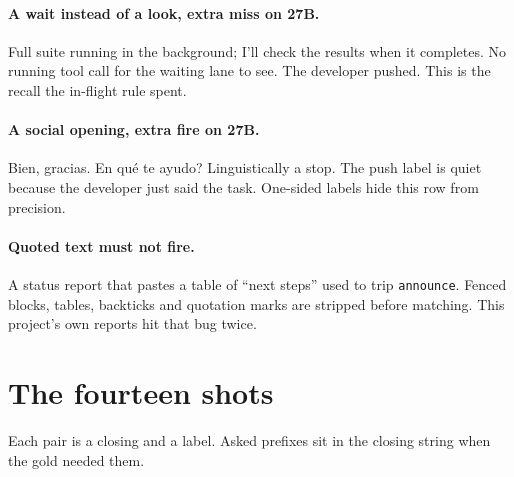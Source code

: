 \paragraph{A wait instead of a look, extra miss on 27B.}
Full suite running in the background; I'll check the results when it
completes. No running tool call for the waiting lane to see. The
developer pushed. This is the recall the in-flight rule spent.

\paragraph{A social opening, extra fire on 27B.}
Bien, gracias. \textquestiondown En qu\'e te ayudo? Linguistically a
stop. The push label is quiet because the developer just said the
task. One-sided labels hide this row from precision.

\paragraph{Quoted text must not fire.}
A status report that pastes a table of ``next steps'' used to trip
\texttt{announce}. Fenced blocks, tables, backticks and quotation
marks are stripped before matching. This project's own reports
hit that bug twice.


\section{The fourteen shots}
\label{app:shots}

Each pair is a closing and a label. Asked prefixes sit in the
closing string when the gold needed them.

